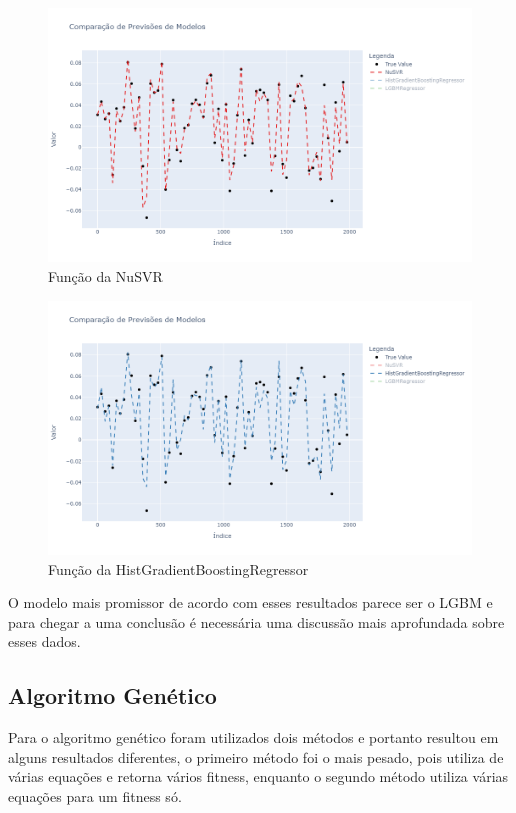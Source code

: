 \documentclass[journal]{IEEEtran}
\begin{document}
\begin{figure}[H]
    \centering
    \includegraphics[width=1\linewidth]{NuSVR_Func.png}
    \caption{Função da NuSVR}
    \label{fig:NuSVR_Func}
\end{figure}

\begin{figure}[H]
    \centering
    \includegraphics[width=1\linewidth]{HistGradientBoostingRegressor.png}
    \caption{Função da HistGradientBoostingRegressor}
    \label{fig:HGBR_Func}
\end{figure}

O modelo mais promissor de acordo com esses resultados parece ser o LGBM e para chegar a uma conclusão é necessária uma discussão mais aprofundada sobre esses dados.


\subsection{Algoritmo Genético}

Para o algoritmo genético foram utilizados dois métodos e portanto resultou em alguns resultados diferentes, o primeiro método foi o mais pesado, pois utiliza de várias equações e retorna vários fitness, enquanto o segundo método utiliza várias equações para um fitness só.
\end{document}
